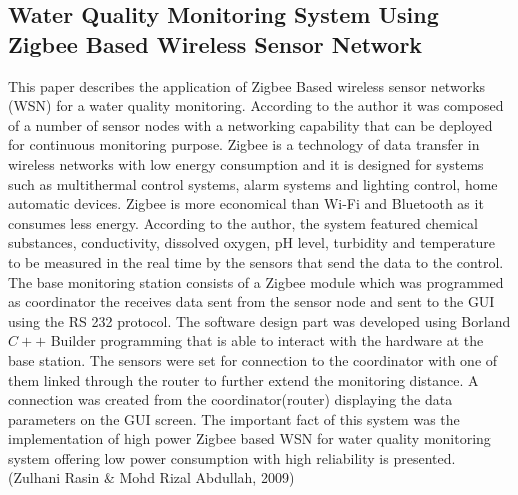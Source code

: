 \documentclass[12pt]{article}
\begin{document}
			\subsection*{Water Quality Monitoring System Using Zigbee Based Wireless Sensor Network}	
				This paper describes the application of Zigbee Based wireless sensor networks (WSN) for a water quality monitoring. According to the author it was composed of a number of sensor nodes with a networking capability that can be deployed for continuous monitoring purpose. Zigbee is a technology of data transfer in wireless networks with low energy consumption and it is designed for systems such as multithermal control systems, alarm systems and lighting control, home automatic devices. Zigbee is more economical than Wi-Fi and Bluetooth as it consumes less energy. According to the author, the system featured chemical substances, conductivity, dissolved oxygen, pH level, turbidity and temperature to be measured in the real time by the sensors that send the data to the control. The base monitoring station consists of a Zigbee module which was programmed as coordinator the receives data sent from the sensor node and sent to the GUI using the RS 232 protocol. The software design part was developed using Borland $C++$ Builder programming that is able to interact with the hardware at the base station. The sensors were set for connection to the coordinator with one of them linked through the router to further extend the monitoring distance. A connection was created from the coordinator(router) displaying the data parameters on the GUI screen. The important fact of this system was the  implementation of high power Zigbee based WSN for water quality monitoring system offering low power consumption with high reliability is presented. (Zulhani Rasin \& Mohd Rizal Abdullah, 2009)
				
\end{document}
